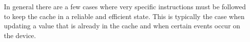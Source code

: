 \documentclass[pdftex,a4paper,12pt,twoside]{report}
\begin{document}
\\\\
In general there are a few cases where very specific instructions must be followed to keep the cache in a reliable and efficient state. This is typically the case when updating a value that is already in the cache and when certain events occur on the device.




\listoffigures
\end{document}
